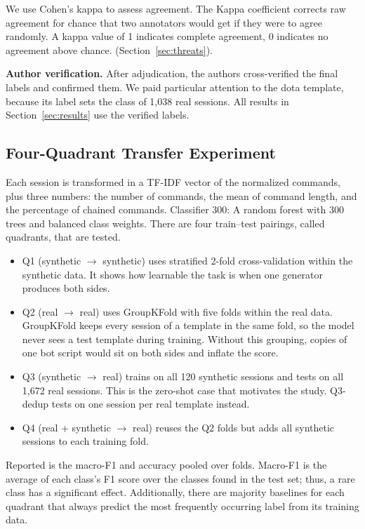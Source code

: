 \documentclass[runningheads]{llncs}
\begin{document}
We use Cohen's kappa \cite{cohen1960kappa} to assess agreement. The Kappa coefficient corrects raw agreement for chance that two annotators would get if they were to agree randomly. A kappa value of 1 indicates complete agreement, 0 indicates no agreement above chance. (Section~\ref{sec:threats}).

\textbf{Author verification.} After adjudication, the authors cross-verified the final labels and confirmed them. We paid particular attention to the dota template, because its label sets the class of 1,038 real sessions. All results in Section~\ref{sec:results} use the verified labels.

\subsection{Four-Quadrant Transfer Experiment}

Each session is transformed in a TF-IDF vector of the normalized commands, plus three numbers: the number of commands, the mean of command length, and the percentage of chained commands. Classifier 300: A random forest with 300 trees and balanced class weights. There are four train--test pairings, called quadrants, that are tested.
\begin{itemize}
\item Q1 (synthetic $\rightarrow$ synthetic) uses stratified 2-fold cross-validation within the synthetic data. It shows how learnable the task is when one generator produces both sides.
\item Q2 (real $\rightarrow$ real) uses GroupKFold with five folds within the real data. GroupKFold keeps every session of a template in the same fold, so the model never sees a test template during training. Without this grouping, copies of one bot script would sit on both sides and inflate the score.
\item Q3 (synthetic $\rightarrow$ real) trains on all 120 synthetic sessions and tests on all 1,672 real sessions. This is the zero-shot case that motivates the study. Q3-dedup tests on one session per real template instead.
\item Q4 (real + synthetic $\rightarrow$ real) reuses the Q2 folds but adds all synthetic sessions to each training fold.
\end{itemize}

Reported is the macro-F1 and accuracy pooled over folds. Macro-F1 is the average of each class's F1 score over the classes found in the test set; thus, a rare class has a significant effect. Additionally, there are majority baselines for each quadrant that always predict the most frequently occurring label from its training data.
\end{document}
